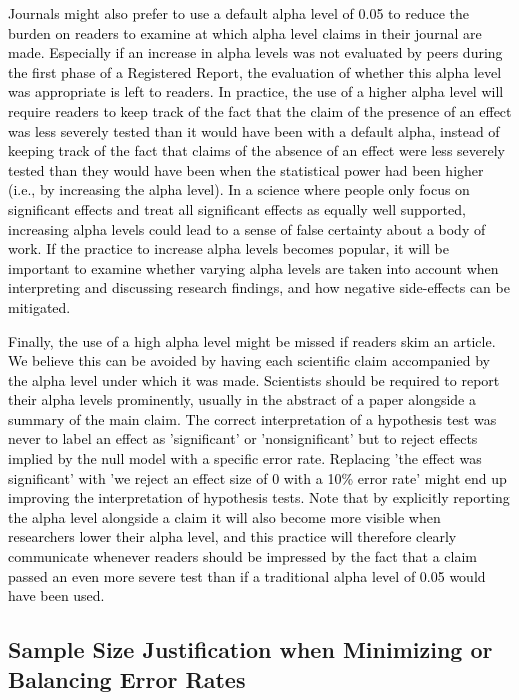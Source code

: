 \documentclass[
  english,
  ,man, a4paper,floatsintext]{apa6}
\begin{document}
\textcolor{black}{Journals might also prefer to use a default alpha level of 0.05 to reduce the burden on readers to examine at which alpha level claims in their journal are made. Especially if an increase in alpha levels was not evaluated by peers during the first phase of a Registered Report, the evaluation of whether this alpha level was appropriate is left to readers. In practice, the use of a higher alpha level will require readers to keep track of the fact that the claim of the presence of an effect was less severely tested than it would have been with a default alpha, instead of keeping track of the fact that claims of the absence of an effect were less severely tested than they would have been when the statistical power had been higher (i.e., by increasing the alpha level). In a science where people only focus on significant effects and treat all significant effects as equally well supported, increasing alpha levels could lead to a sense of false certainty about a body of work. If the practice to increase alpha levels becomes popular, it will be important to examine whether varying alpha levels are taken into account when interpreting and discussing research findings, and how negative side-effects can be mitigated.}

\textcolor{black}{Finally, the use of a high alpha level might be missed if readers skim an article. We believe this can be avoided by having each scientific claim accompanied by the alpha level under which it was made. Scientists should be required to report their alpha levels prominently, usually in the abstract of a paper alongside a summary of the main claim. The correct interpretation of a hypothesis test was never to label an effect as 'significant' or 'nonsignificant' but to reject effects implied by the null model with a specific error rate. Replacing 'the effect was significant' with 'we reject an effect size of 0 with a 10\% error rate' might end up improving the interpretation of hypothesis tests. Note that by explicitly reporting the alpha level alongside a claim it will also become more visible when researchers lower their alpha level, and this practice will therefore clearly communicate whenever readers should be impressed by the fact that a claim passed an even more severe test than if a traditional alpha level of 0.05 would have been used.}

\hypertarget{sample-size-justification-when-minimizing-or-balancing-error-rates}{%
\subsection{Sample Size Justification when Minimizing or Balancing Error Rates}\label{sample-size-justification-when-minimizing-or-balancing-error-rates}}
\end{document}
